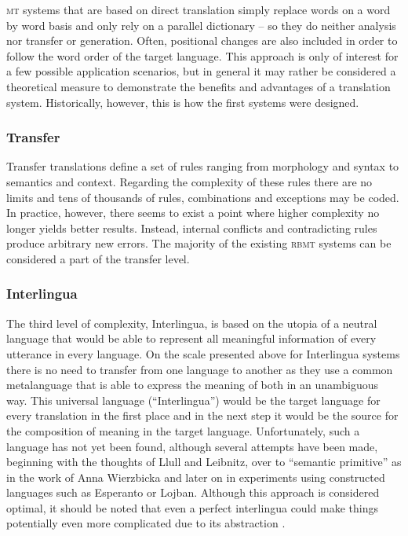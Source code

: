 \documentclass[output=paper]{LSP/langsci}
\begin{document}
\textsc{mt} systems that are based on direct translation simply replace words on a word by word basis and only rely on a parallel dictionary -- so they do neither analysis nor transfer or generation. Often, positional changes are also included in order to follow the word order of the target language. This approach is only of interest for a few possible application scenarios, but in general it may rather be considered a theoretical measure to demonstrate the benefits and advantages of a translation system.  
Historically, however, this is how the first systems were designed.

\subsubsection{Transfer}\label{sec:stein:3.1.2}

Transfer translations define a set of rules ranging from morphology and syntax to semantics and context. Regarding the complexity of these rules there are no limits and tens of thousands of rules, combinations and exceptions may be coded. In practice, however, there seems to exist a point where higher complexity no longer yields better results. Instead, internal conflicts and contradicting rules produce arbitrary new errors. The majority of the existing \textsc{rbmt} systems can be considered a part of the transfer level.

\subsubsection{Interlingua}\label{sec:stein:3.1.3}

The third level of complexity, Interlingua, is based on the utopia of a neutral language that would be able to represent all meaningful information of every utterance in every language. On the scale presented above for Interlingua systems there is no need to transfer from one language to another as they use a common metalanguage that is able to express the meaning of both in an unambiguous way. This universal language (``Interlingua'') would be the target language for every translation in the first place and in the next step it would be the source for the composition of meaning in the target language. Unfortunately, such a language has not yet been found, although several attempts have been made, beginning with the thoughts of Llull and Leibnitz, over to ``semantic primitive'' as in the work of Anna Wierzbicka \citep{Wierzbicka1996} and later on in experiments using constructed languages such as Esperanto or Lojban. Although this approach is considered optimal, it should be noted that even a perfect interlingua could make things potentially even more complicated due to its abstraction \citep{Nicholas1996}.
\end{document}
